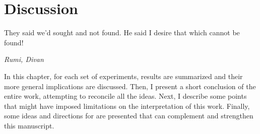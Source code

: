 \chapter{Discussion}
\label{ch:discussion}
{\singlespacing \epigraph{They said we'd sought and not found. He said I desire that which cannot be found!}
{\textit{Rumi, Divan}}}
\noindent
In this chapter, for each set of experiments, results are summarized and their more general implications are discussed.
Then, I present a short conclusion of the entire work, attempting to reconcile all the ideas.
Next, I describe some points that might have imposed limitations on the interpretation of this work.
Finally, some ideas and directions for are presented that can complement and strengthen this manuscript.




